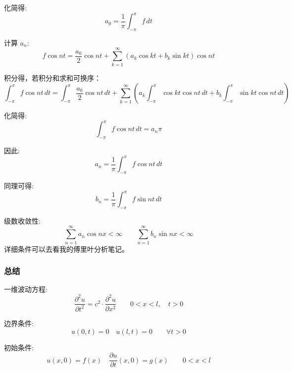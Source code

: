 \documentclass[12pt,a4paper]{article}
\numberwithin{subsection}{section}   %
\numberwithin{subsubsection}{subsection}
\theoremstyle{plain}
\theoremstyle{definition}
\theoremstyle{remark}
\theoremstyle{remark}
\begin{document}
	化简得:
	\begin{equation}
		a_0 = \frac{1}{\pi} \int_{-\pi}^{\pi} f \, dt
	\end{equation}
	
	计算 \( a_n \):
	\begin{equation}
		f \cos nt = \frac{a_0}{2} \cos nt + \sum_{k=1}^{\infty} \left( a_k \cos kt + b_k \sin kt \right) \cos nt
	\end{equation}
	
	积分得，若积分和求和可换序：
	\begin{equation}
		\int_{-\pi}^{\pi} f \cos nt \, dt = \int_{-\pi}^{\pi} \frac{a_0}{2} \cos nt \, dt + \sum_{k=1}^{\infty} \left( a_k \int_{-\pi}^{\pi} \cos kt \cos nt \, dt + b_k \int_{-\pi}^{\pi} \sin kt \cos nt \, dt \right)
	\end{equation}
	
	化简得:
	\begin{equation}
		\int_{-\pi}^{\pi} f \cos nt \, dt = a_n \pi
	\end{equation}
	
	因此:
	\begin{equation}
		a_n = \frac{1}{\pi} \int_{-\pi}^{\pi} f \cos nt \, dt
	\end{equation}
	
	同理可得:
	\begin{equation}
		b_n = \frac{1}{\pi} \int_{-\pi}^{\pi} f \sin nt \, dt
	\end{equation}
	
	级数收敛性:
	\begin{equation}
		\sum_{n=1}^{\infty} a_n \cos nx < \infty \qquad \sum_{n=1}^{\infty} b_n \sin nx < \infty
	\end{equation}
	详细条件可以去看我的傅里叶分析笔记。
	
	\subsubsection{总结}
	
	一维波动方程:
	\begin{equation}
		\frac{\partial^2 u}{\partial t^2} = c^2 \cdot \frac{\partial^2 u}{\partial x^2} \qquad 0 < x < l, \quad t > 0
	\end{equation}
	
	边界条件:
	\begin{equation}
		u(0, t) = 0 \quad u(l, t) = 0 \qquad \forall t > 0
	\end{equation}
	
	初始条件:
	\begin{equation}
		u(x, 0) = f(x) \quad \frac{\partial u}{\partial t}(x, 0) = g(x) \qquad 0 < x < l
	\end{equation}
	
\end{document}
